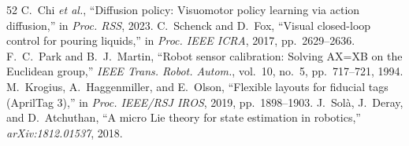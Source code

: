 \documentclass{evidencescene}
\begin{document}
\begin{thebibliography}{52}
 C.~Chi \emph{et al.}, ``Diffusion policy: Visuomotor policy learning via action diffusion,'' in \emph{Proc. RSS}, 2023.
 C.~Schenck and D.~Fox, ``Visual closed-loop control for pouring liquids,'' in \emph{Proc. IEEE ICRA}, 2017, pp.~2629--2636.
 F.~C.~Park and B.~J.~Martin, ``Robot sensor calibration: Solving AX=XB on the Euclidean group,'' \emph{IEEE Trans. Robot. Autom.}, vol.~10, no.~5, pp.~717--721, 1994.
 M.~Krogius, A.~Haggenmiller, and E.~Olson, ``Flexible layouts for fiducial tags (AprilTag 3),'' in \emph{Proc. IEEE/RSJ IROS}, 2019, pp.~1898--1903.
 J.~Sol\`a, J.~Deray, and D.~Atchuthan, ``A micro Lie theory for state estimation in robotics,'' \emph{arXiv:1812.01537}, 2018.
\end{thebibliography}
\end{document}
